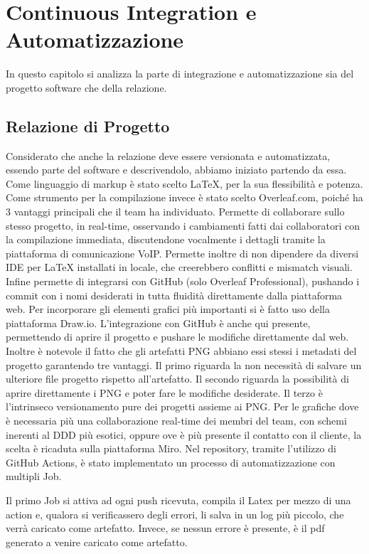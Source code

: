 \section{Continuous Integration e Automatizzazione}
\label{chap:CI}
In questo capitolo si analizza la parte di integrazione e automatizzazione sia del progetto software che della relazione. 
    \subsection{Relazione di Progetto}
        Considerato che anche la relazione deve essere versionata e automatizzata, essendo parte del software e descrivendolo, abbiamo iniziato partendo da essa. 
        Come linguaggio di markup è stato scelto {\LaTeX}, per la sua flessibilità e potenza. 
        Come strumento per la compilazione invece è stato scelto Overleaf.com, poiché ha 3 vantaggi principali che il team ha individuato. Permette di collaborare sullo stesso progetto, in real-time, osservando i cambiamenti fatti dai collaboratori con la compilazione immediata, discutendone vocalmente i dettagli tramite la piattaforma di comunicazione VoIP. Permette inoltre di non dipendere da diversi IDE per {\LaTeX} installati in locale, che creerebbero conflitti e mismatch visuali. Infine permette di integrarsi con GitHub (solo Overleaf Professional), pushando i commit con i nomi desiderati in tutta fluidità direttamente dalla piattaforma web.
        Per incorporare gli elementi grafici più importanti si è fatto uso della piattaforma Draw.io. L'integrazione con GitHub è anche qui presente, permettendo di aprire il progetto e pushare le modifiche direttamente dal web. Inoltre è notevole il fatto che gli artefatti PNG abbiano essi stessi i metadati del progetto garantendo tre vantaggi. Il primo riguarda la non necessità di salvare un ulteriore file progetto rispetto all'artefatto. Il secondo riguarda la possibilità di aprire direttamente i PNG e poter fare le modifiche desiderate. Il terzo è l'intrinseco versionamento pure dei progetti assieme ai PNG. 
        Per le grafiche dove è necessaria più una collaborazione real-time dei membri del team, con schemi inerenti al DDD più esotici, oppure ove è più presente il contatto con il cliente, la scelta è ricaduta sulla piattaforma Miro.
        Nel repository, tramite l'utilizzo di GitHub Actions, è stato implementato un processo di automatizzazione con multipli Job. 
        
        Il primo Job si attiva ad ogni push ricevuta, compila il Latex per mezzo di una action e, qualora si verificassero degli errori, li salva in un log più piccolo, che verrà caricato come artefatto. Invece, se nessun errore è presente, è il pdf generato a venire caricato come artefatto.
        
